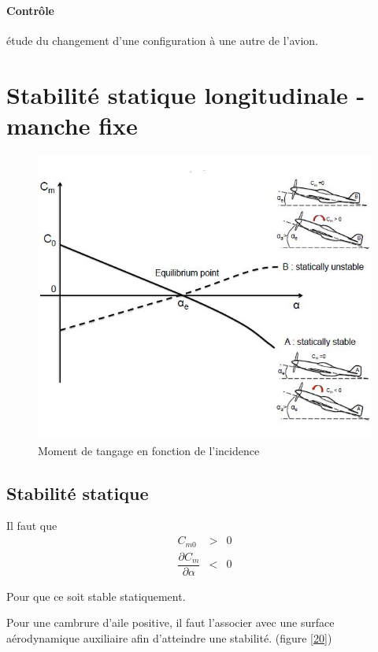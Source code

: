 \documentclass{report}
\begin{document}
\paragraph{Contrôle} étude du changement d'une configuration à une autre de l'avion.

\section{Stabilité statique longitudinale - manche fixe}

\begin{figure}[h!]
    \centering
    \includegraphics[scale=0.7]{19.JPG}
    \caption{Moment de tangage en fonction de l'incidence}
    \label{19}
\end{figure}

\subsection{Stabilité statique}

Il faut que 
\begin{eqnarray}
C_{m0} &> &0\\
\dfrac{\partial C_m}{\partial \alpha} &< &0
\end{eqnarray}

Pour que ce soit stable statiquement.

Pour une cambrure d'aile positive, il faut l'associer avec une surface aérodynamique auxiliaire afin d'atteindre une stabilité. (figure \ref{20})
\end{document}
